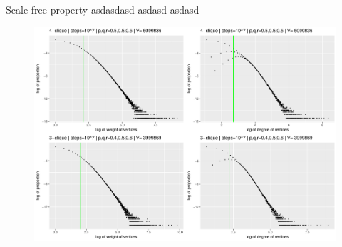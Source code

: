 \begin{block}{Scale-free property}
  asdasdasd
  \newline asdasd
  \newline asdasd

  \begin{figure}                  
  \includegraphics[width=0.8\linewidth]{./fig/klikkdist4.pdf}
\end{figure}
\end{block}
